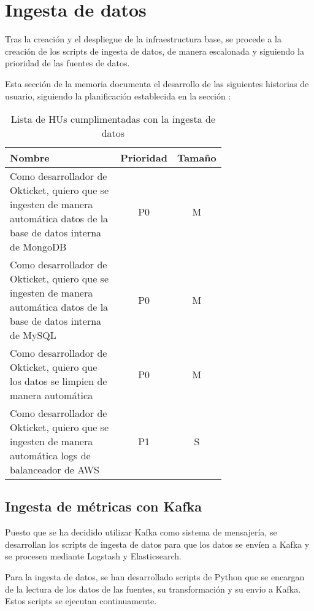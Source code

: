 \section{Ingesta de datos}\label{sec:impl_ingesta}
Tras la creación y el despliegue de la infraestructura base, se procede a la
creación de los scripts de ingesta de datos, de manera escalonada y siguiendo
la prioridad de las fuentes de datos.

Esta sección de la memoria documenta el desarrollo de las siguientes historias
de usuario, siguiendo la planificación establecida en la sección :

\begin{table}[H]
	\centering
	\begin{tabular}{|p{0.7\linewidth}|c|c|}
		\hline
		\textbf{Nombre} & \textbf{Prioridad} & \textbf{Tamaño} \\
		\hline
		\hline
		Como desarrollador de Okticket, quiero que se ingesten de manera automática datos de la base de datos interna de MongoDB & P0\cellcolor{red!50} & M\cellcolor{yellow!50} \\
		\hline
		Como desarrollador de Okticket, quiero que se ingesten de manera automática datos de la base de datos interna de MySQL & P0\cellcolor{red!50} & M\cellcolor{yellow!50} \\
		\hline
		Como desarrollador de Okticket, quiero que los datos se limpien de manera automática & P0\cellcolor{red!50} & M\cellcolor{yellow!50} \\
		\hline
		Como desarrollador de Okticket, quiero que se ingesten de manera automática logs de balanceador de AWS & P1\cellcolor{orange!50} & S\cellcolor{green!25} \\
		\hline
  \end{tabular}
  \caption{Lista de HUs cumplimentadas con la ingesta de datos}
  \label{tab:impl_ingesta}
\end{table}


\newpage{}
\subsection{Ingesta de métricas con Kafka}\label{subsec:impl_ingesta_kafka}
Puesto que se ha decidido utilizar Kafka como sistema de mensajería, se
desarrollan los scripts de ingesta de datos para que los datos se envíen a
Kafka y se procesen mediante Logstash y Elasticsearch.

Para la ingesta de datos, se han desarrollado scripts de Python que se encargan
de la lectura de los datos de las fuentes, su transformación y su envío a Kafka.
Estos scripts se ejecutan continuamente.

